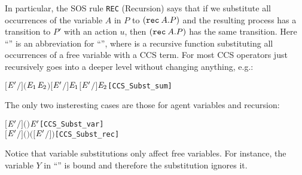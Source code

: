 In particular, the SOS rule \texttt{REC} (Recursion)
 says that if we substitute all occurrences of the variable $A$ in $P$ to
$({\tt rec}\: A . P)$ and the resulting process has a transition to $P'$
with an action $u$, then $({\tt rec}\: A . P)$ has the same
transition. Here ``'' is an abbreviation
for ``'', where  is a
recursive function substituting all occurrences of a free variable with a CCS term.
For most CCS operators  just recursively goes into a deeper
level without changing anything, e.g.:
\begin{alltt}
\HOLTokenTurnstile{} \ensuremath{[}\ensuremath{\HOLFreeVar{E}\sp{\prime}}\ensuremath{/}\ensuremath{]} \ensuremath{(}\ensuremath{\HOLFreeVar{E}\sb{\mathrm{1}}} \HOLSymConst{\ensuremath{+}} \ensuremath{\HOLFreeVar{E}\sb{\mathrm{2}}}\ensuremath{)} \HOLSymConst{\ensuremath{=}} \ensuremath{[}\ensuremath{\HOLFreeVar{E}\sp{\prime}}\ensuremath{/}\ensuremath{]} \ensuremath{\HOLFreeVar{E}\sb{\mathrm{1}}} \HOLSymConst{\ensuremath{+}} \ensuremath{[}\ensuremath{\HOLFreeVar{E}\sp{\prime}}\ensuremath{/}\ensuremath{]} \ensuremath{\HOLFreeVar{E}\sb{\mathrm{2}}}\hfill{[CCS_Subst_sum]}
\end{alltt}
The only two insteresting cases are those for agent variables and recursion:
\begin{alltt}
\HOLTokenTurnstile{} \ensuremath{[}\ensuremath{\HOLFreeVar{E}\sp{\prime}}\ensuremath{/}\ensuremath{]} \ensuremath{(} \ensuremath{)} \HOLSymConst{\ensuremath{=}}   \HOLSymConst{\ensuremath{=}}   \ensuremath{\HOLFreeVar{E}\sp{\prime}}   \hfill{[CCS_Subst_var]}
\HOLTokenTurnstile{} \ensuremath{[}\ensuremath{\HOLFreeVar{E}\sp{\prime}}\ensuremath{/}\ensuremath{]} \ensuremath{(}  \ensuremath{)} \HOLSymConst{\ensuremath{=}}   \HOLSymConst{\ensuremath{=}}         \ensuremath{(}\ensuremath{[}\ensuremath{\HOLFreeVar{E}\sp{\prime}}\ensuremath{/}\ensuremath{]} \ensuremath{)}\hfill{[CCS_Subst_rec]}
\end{alltt}
Notice that variable substitutions only affect free
variables. For instance, the variable $Y$ in ``'' is
bound and therefore the substitution ignores it.

